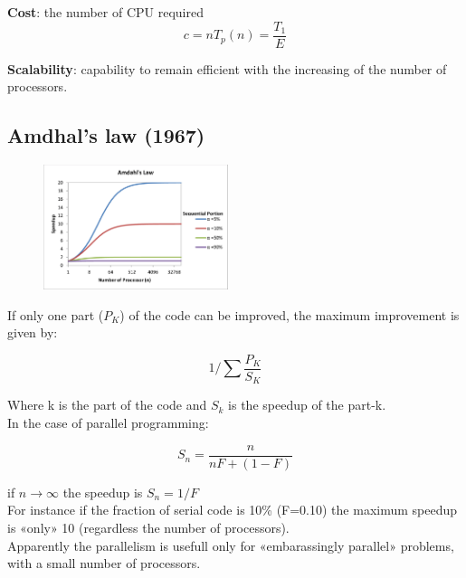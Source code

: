 \textbf{Cost}: the number of CPU required
\begin{equation*}
    c = n T_p(n) = \dfrac{T_1}{E}
\end{equation*}

\textbf{Scalability}: capability to remain efficient with the increasing of the number of processors.

\subsection{Amdhal’s law (1967)}

\begin{figure}
  \begin{center}
    \includegraphics[width=0.48\textwidth]{figure_parallel/amdahl.png}
  \end{center}
\end{figure}

If only one part ($P_K$) of the code can be improved, the maximum improvement is given by:

\begin{equation*}
    1/\sum\dfrac{P_K}{S_K}
\end{equation*}

Where k is the part of the code and $S_k$ is the speedup of the part-k.\\

In the case of parallel programming:

\begin{equation*}
    S_n = \dfrac{n}{nF + (1-F)}
\end{equation*}

if $n \longrightarrow \infty$ the speedup is $S_n = 1/F$\\
For instance if the fraction of serial code is 10\% (F=0.10) the maximum speedup is «only» 10 (regardless the number of processors).\\
Apparently the parallelism is usefull only for «embarassingly parallel» problems, with a small number of processors.



